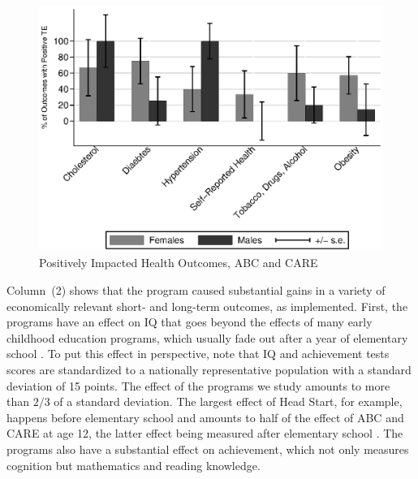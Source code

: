 \begin{figure}[H]
		\caption{Positively Impacted Health Outcomes, ABC and CARE} \label{fig:ppositivecategory2}
		\includegraphics[width=.78\columnwidth]{output/itt_noctrl_cats2.eps}
\end{figure} 

\noindent Column~(2) shows that the program caused substantial gains in a variety of economically relevant short- and long-term outcomes, as implemented. First, the programs have an effect on IQ that goes beyond the effects of many early childhood education programs, which usually fade out after a year of elementary school \citep{Hojman_2015_EvidenceFadeOut,Elango_Hojman_etal_2016_Early-Edu}. To put this effect in perspective, note that IQ and achievement tests scores are standardized to a nationally representative population with a standard deviation of 15 points. The effect of the programs we study amounts to more than $2/3$ of a standard deviation. The largest effect of Head Start, for example, happens before elementary school and amounts to half of the effect of ABC and CARE at age 12, the latter effect being measured after elementary school \citep{Elango_Hojman_etal_2016_Early-Edu}. The programs also have a substantial effect on achievement, which not only measures cognition but mathematics and reading knowledge.

